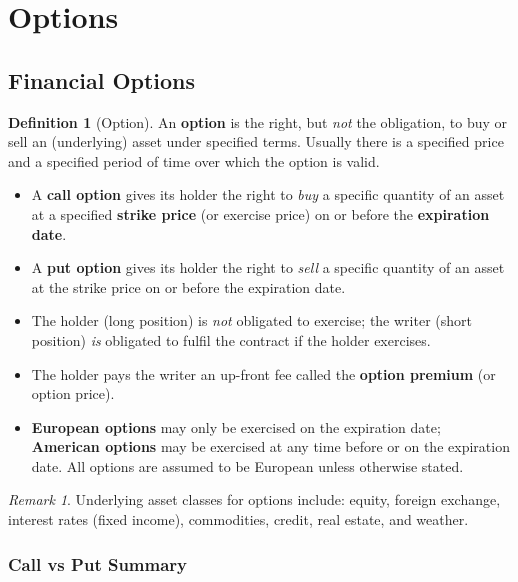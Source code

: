 \documentclass[12pt, a4paper]{article}
\theoremstyle{plain}
\theoremstyle{definition}
\newtheorem{definition}[theorem]{Definition}
\theoremstyle{remark}
\newtheorem{remark}[theorem]{Remark}
\begin{document}
\pagebreak
\section{Options}

\subsection{Financial Options}

\begin{definition}[Option]
  An \textbf{option} is the right, but \emph{not} the obligation, to buy or sell an (underlying) asset under specified terms. Usually there is a specified price and a specified period of time over which the option is valid.
  \begin{itemize}
    \item A \textbf{call option} gives its holder the right to \emph{buy} a specific quantity of an asset at a specified \textbf{strike price} (or exercise price) on or before the \textbf{expiration date}.
    \item A \textbf{put option} gives its holder the right to \emph{sell} a specific quantity of an asset at the strike price on or before the expiration date.
    \item The holder (long position) is \emph{not} obligated to exercise; the writer (short position) \emph{is} obligated to fulfil the contract if the holder exercises.
    \item The holder pays the writer an up-front fee called the \textbf{option premium} (or option price).
    \item \textbf{European options} may only be exercised on the expiration date; \textbf{American options} may be exercised at any time before or on the expiration date. All options are assumed to be European unless otherwise stated.
  \end{itemize}
\end{definition}

\begin{remark}
  Underlying asset classes for options include: equity, foreign exchange, interest rates (fixed income), commodities, credit, real estate, and weather.
\end{remark}

\subsubsection*{Call vs Put Summary}
\end{document}
